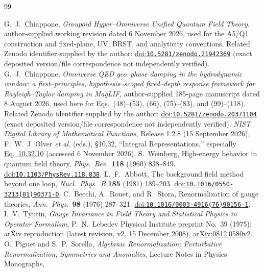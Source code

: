 \documentclass[final,5p,times,twocolumn,numbers,nopreprintline]{elsarticle}
\numberwithin{equation}{section}
\theoremstyle{definition}
\theoremstyle{remark}
\begin{document}
\begingroup
\raggedright
\begin{thebibliography}{99}

G.~J.~Chiappone,
\emph{Groupoid Hyper--Omniverse Unified Quantum Field Theory},
author-supplied working revision dated 6 November 2026,
used for the A5/Q1 construction and fixed-plane, UV, BRST, and
analyticity conventions. Related Zenodo identifier supplied by the author:
\href{https://doi.org/10.5281/zenodo.21942369}{doi:\nolinkurl{10.5281/zenodo.21942369}}
(exact deposited version/file correspondence not independently verified).
G.~J.~Chiappone,
\emph{Omniverse QED geo--phase damping in the hydrodynamic window:
a first--principles, hypothesis--scoped fixed--depth response framework
for Rayleigh--Taylor damping in MagLIF},
author-supplied 185-page manuscript dated 8 August 2026,
used here for Eqs.~(48)--(53), (66), (75)--(83), and (99)--(118).
Related Zenodo identifier supplied by the author:
\href{https://doi.org/10.5281/zenodo.20371104}{doi:\nolinkurl{10.5281/zenodo.20371104}}
(exact deposited version/file correspondence not independently verified).
\emph{NIST Digital Library of Mathematical Functions},
Release 1.2.8 (15 September 2026), F.~W.~J. Olver \emph{et al.} (eds.),
\S10.32, ``Integral Representations,'' especially
\href{https://dlmf.nist.gov/10.32.E10}{Eq.~10.32.10}
(accessed 6 November 2026).
S.~Weinberg,
High-energy behavior in quantum field theory,
\emph{Phys.\ Rev.}\ \textbf{118} (1960) 838--849.
\href{https://doi.org/10.1103/PhysRev.118.838}{doi:\nolinkurl{10.1103/PhysRev.118.838}}.
L.~F.~Abbott,
The background field method beyond one loop,
\emph{Nucl.\ Phys.\ B} \textbf{185} (1981) 189--203.
\href{https://doi.org/10.1016/0550-3213(81)90371-0}{doi:\nolinkurl{10.1016/0550-3213(81)90371-0}}.
C.~Becchi, A.~Rouet, and R.~Stora,
Renormalization of gauge theories,
\emph{Ann.\ Phys.}\ \textbf{98} (1976) 287--321.
\href{https://doi.org/10.1016/0003-4916(76)90156-1}{doi:\nolinkurl{10.1016/0003-4916(76)90156-1}}.
I.~V.~Tyutin,
\emph{Gauge Invariance in Field Theory and Statistical Physics
in Operator Formalism}, P.~N.~Lebedev Physical Institute preprint
No.~39 (1975); arXiv reproduction (latest revision, v2,
15 December 2008),
\href{https://arxiv.org/abs/0812.0580v2}{arXiv:0812.0580v2}.
O.~Piguet and S.~P.~Sorella,
\emph{Algebraic Renormalization: Perturbative Renormalization,
Symmetries and Anomalies}, Lecture Notes in Physics Monographs,

\end{thebibliography}
\end{document}
